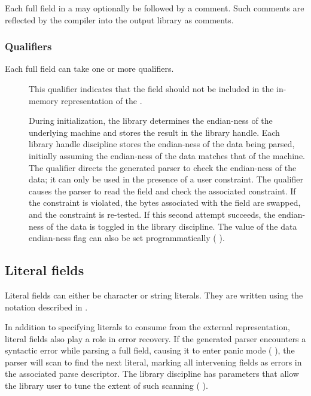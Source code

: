 Each full field in a \struct{} may optionally be followed by a \padsl{}
comment. Such comments are reflected by the \pads{} compiler into the
output library as comments. 

\subsubsection{Qualifiers}
Each full field can take one or more qualifiers.
\begin{description}
\item[\pomit{}] This qualifier indicates that the field
  should not be included in the in-memory representation of the
  \struct{}. 
\item[\pendian{}] During initialization, the \pads{} library
  determines the endian-ness of the underlying machine and stores the
  result in the library handle.  Each library handle discipline stores
  the endian-ness of the data being parsed, initially assuming the
  endian-ness of the data matches that of the machine.  The \pendian{}
  qualifier directs the generated parser to check the endian-ness of
  the data; it can only be used in the presence of a user constraint.
  The qualifier causes the parser to read the field and check the
  associated constraint.  If the constraint is violated, the bytes
  associated with the field are swapped, and the constraint is
  re-tested.  If this second attempt succeeds, the endian-ness of the
  data is toggled in the library discipline.  The value of the data
  endian-ness flag can also be set programmatically (\cf
  ).
\end{description}

\subsection{Literal fields}
Literal fields can either be character or string literals.  They are
written using the notation described in .  

In addition to specifying literals to consume from the external
representation, literal fields also play a role in error recovery.  If
the generated parser encounters a syntactic error while parsing a full
field, causing it to enter panic mode (\cf{}
), the parser will scan to find the next
literal, marking all intervening fields as errors in the
associated parse descriptor.  The library discipline has parameters
that allow the library user to tune the extent of such scanning
(\cf{} ).

